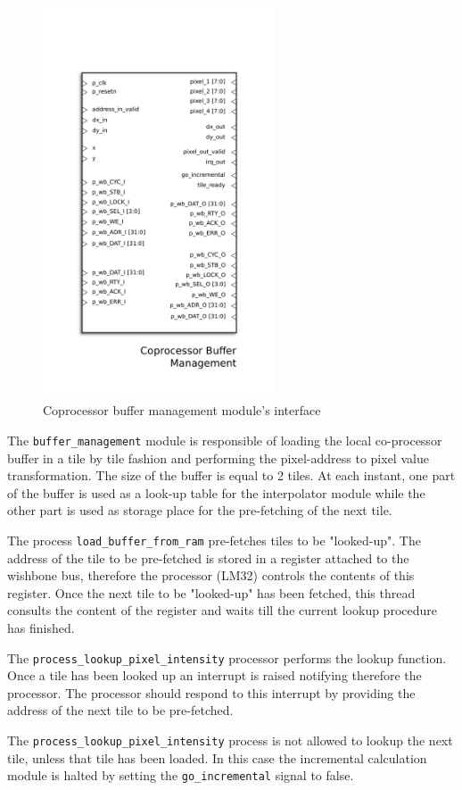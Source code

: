 \begin{figure}[H]
\center
\includegraphics[width=6.9cm]{figs/Buffer_management.pdf}
\caption{Coprocessor buffer management module's interface}
\label{buff_out_ports}
\end{figure}


The \texttt{buffer\_management} module is responsible of loading the local co-processor buffer in a tile by tile fashion and performing the pixel-address to pixel value transformation. The size of the buffer is equal to 2 tiles. At each instant, one part of the buffer is used as a look-up table for the interpolator module while the other part is used as storage place for the pre-fetching of the next tile. 

The process \texttt{load\_buffer\_from\_ram} pre-fetches tiles  to be "looked-up". The address of the tile to be pre-fetched is stored in a register attached to the wishbone bus, therefore the processor (LM32) controls the contents of this register. Once the next tile to be "looked-up" has been fetched, this thread consults the content of the register and waits till the current lookup procedure has finished. 

The  \texttt{process\_lookup\_pixel\_intensity}  processor performs the lookup function. Once a tile has been looked up an interrupt is raised notifying therefore the processor. The processor should respond to this interrupt by providing the address of the next tile to be pre-fetched. 

The \texttt{process\_lookup\_pixel\_intensity} process is not allowed to lookup the next tile, unless that tile has been loaded. In this case the incremental calculation module is halted by setting the \texttt{go\_incremental} signal to false.  
